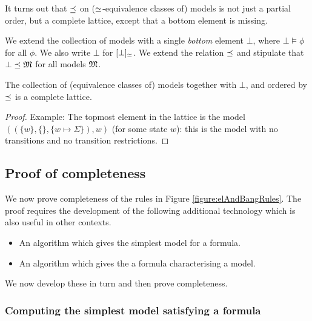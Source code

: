 It turns out that $\preceq $ on ($\simeq$-equivalence classes of)
models is not just a partial order, but a complete lattice, except
that a bottom element is missing.

\begin{definition}
We extend the collection of models with a single \emph{bottom} element
$\bot$, where $\bot \models \phi$ for all $\phi$. We also write $\bot$
for $[\bot]_{\simeq}$.  We extend the relation $\preceq $ and
stipulate that $\bot \preceq \frak{M}$ for all models $\frak{M}$.
\end{definition}

\begin{theorem}
The collection of (equivalence classes of) models together with
$\bot$, and ordered by $\preceq$ is a complete lattice.
\end{theorem}
\begin{proof}
  Example: The topmost element in the
lattice is the model $( (\{w\}, \{\}, \{w \mapsto \Sigma\}), w)$ (for
some state $w$): this is the model with no transitions and no
transition restrictions.
\end{proof}

\subsection{Proof of completeness}\label{completenessProof}

\NI We now prove completeness of the rules in Figure
\ref{figure:elAndBangRules}.  The proof requires the development of
the following additional technology which is also useful in other
contexts.

\begin{itemize}

\item An algorithm which gives the simplest model for a formula.

\item An algorithm which gives the a formula characterising a model.

\end{itemize}

\NI We now develop these  in turn and then prove completeness.

\subsubsection{Computing the simplest model satisfying a formula}
\label{simpl}

